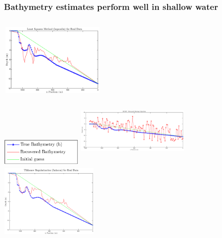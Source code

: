 \documentclass[7pt]{beamer}
\begin{document}
\begin{frame}
	\frametitle{Bathymetry estimates perform well in shallow water}
	   \begin{columns}[t]
        \centering
        \includegraphics[width=5.2cm,height=3.5cm]{img/lsqnonlin_real_data_oct09}\\
        \includegraphics[width=4.0cm,height=1.5cm]{img/legend_simulated.png}
        \centering
       \includegraphics[width=5.5cm,height=3.8cm]{img/MCMC-realdata-5000-nolegend}\\
       \includegraphics[width=4.8cm,height=3.5cm]{img/fmincon_real_data_oct09.png}
      \end{columns}
\end{frame}
\end{document}

